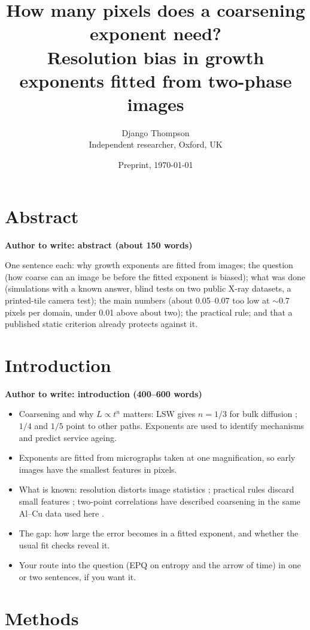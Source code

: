 \documentclass[11pt,a4paper]{article}
\title{How many pixels does a coarsening exponent need?\\[4pt]
\large Resolution bias in growth exponents fitted from two-phase images}
\author{Django Thompson\\ \small Independent researcher, Oxford, UK}
\date{Preprint, \today}
\newenvironment{authorbox}[1]{\begin{framed}\noindent\textcolor{todo}{\textbf{Author to write: #1}}\par\small}{\end{framed}}
\begin{document}
\maketitle

\section*{Abstract}
\begin{authorbox}{abstract (about 150 words)}
One sentence each: why growth exponents are fitted from images; the question
(how coarse can an image be before the fitted exponent is biased); what was
done (simulations with a known answer, blind tests on two public X-ray
datasets, a printed-tile camera test); the main numbers (about 0.05--0.07 too
low at $\sim$0.7 pixels per domain, under 0.01 above about two); the practical
rule; and that a published static criterion already protects against it.
\end{authorbox}

\section{Introduction}
\begin{authorbox}{introduction (400--600 words)}
\begin{itemize}
\item Coarsening and why $L\propto t^n$ matters: LSW gives $n=1/3$ for bulk
diffusion \cite{lifshitz1961,wagner1961}; $1/4$ and $1/5$ point to other paths.
Exponents are used to identify mechanisms and predict service ageing.
\item Exponents are fitted from micrographs taken at one magnification, so
early images have the smallest features in pixels.
\item What is known: resolution distorts image statistics
\cite{ledesma2018,zabler2007}; practical rules discard small features
\cite{werz2014}; two-point correlations have described coarsening in the same
Al--Cu data used here \cite{sun2017}.
\item The gap: how large the error becomes in a fitted exponent, and whether
the usual fit checks reveal it.
\item Your route into the question (EPQ on entropy and the arrow of time) in one
or two sentences, if you want it.
\end{itemize}
\end{authorbox}

\section{Methods}
\end{document}
